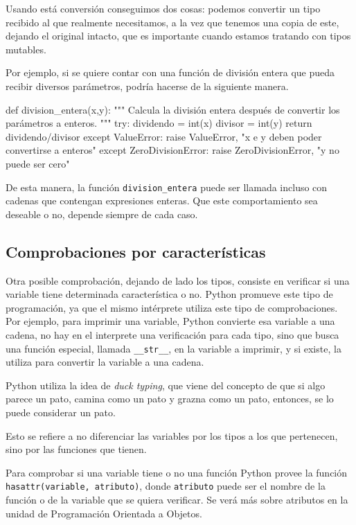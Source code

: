 Usando está conversión conseguimos dos cosas: podemos convertir un tipo
recibido al que realmente necesitamos, a la vez que tenemos una copia de
este, dejando el original intacto, que es importante cuando estamos
tratando con tipos mutables.

Por ejemplo, si se quiere contar con una función de división entera que
pueda recibir diversos parámetros, podría hacerse de la siguiente manera.

\begin{codigo-python-sn}
def division_entera(x,y):
    """ Calcula la división entera después de convertir los parámetros a
    enteros. """
    try:
        dividendo = int(x)
        divisor = int(y)
        return dividendo/divisor
    except ValueError:
        raise ValueError, "x e y deben poder convertirse a enteros"
    except ZeroDivisionError:
        raise ZeroDivisionError, "y no puede ser cero"
\end{codigo-python-sn}

De esta manera, la función \lstinline!division_entera! puede ser llamada
incluso con cadenas que contengan expresiones enteras. Que este
comportamiento sea deseable o no, depende siempre de cada caso.

\subsection{Comprobaciones por características}

Otra posible comprobación, dejando de lado los tipos, consiste en verificar
si una variable tiene determinada característica o no. Python promueve este
tipo de programación, ya que el mismo intérprete utiliza este tipo de
comprobaciones. Por ejemplo, para imprimir una variable, Python convierte
esa variable a una cadena, no hay en el interprete una verificación para
cada tipo, sino que busca una función especial, llamada
\lstinline!__str__!, en la variable a imprimir, y si existe, la utiliza
para convertir la variable a una cadena.

\begin{sabias_que}
Python utiliza la idea de {\it duck typing}, que viene del concepto de que
si algo parece un pato, camina como un pato y grazna como un pato,
entonces, se lo puede considerar un pato.

Esto se refiere a no diferenciar las variables por los tipos a los que
pertenecen, sino por las funciones que tienen.
\end{sabias_que}

Para comprobar si una variable tiene o no una función Python provee la
función \lstinline!hasattr(variable, atributo)!, donde \lstinline!atributo!
puede ser el nombre de la función o de la variable que se quiera verificar.
Se verá más sobre atributos en la unidad de Programación Orientada a
Objetos.

